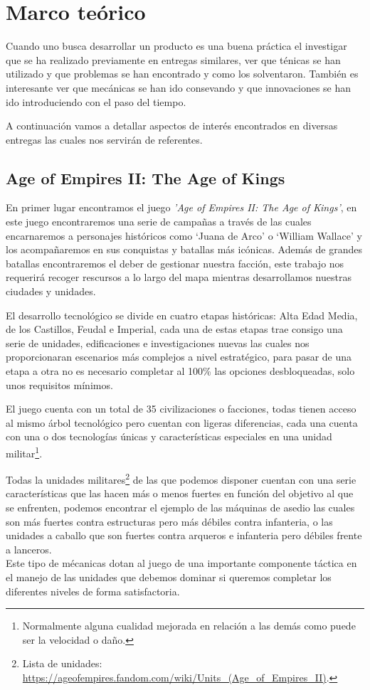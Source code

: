 \chapter{Marco teórico}
\label{Marco_teorico}

Cuando uno busca desarrollar un producto es una buena práctica el investigar que se ha realizado
previamente en entregas similares, ver que ténicas se han utilizado y que problemas se han
encontrado y como los solventaron. También es interesante ver que mecánicas se han ido consevando
y que innovaciones se han ido introduciendo con el paso del tiempo.

A continuación vamos a detallar aspectos de interés encontrados en diversas entregas
las cuales nos servirán de referentes.

\section{Age of Empires II: The Age of Kings}
En primer lugar encontramos el juego \textit{'Age of Empires II: The Age of Kings'}, en
este juego encontraremos una serie de campañas a través de las cuales encarnaremos a personajes
históricos como `Juana de Arco' o `William Wallace' y los acompañaremos en sus conquistas y
batallas más icónicas. Además de grandes batallas encontraremos el deber de gestionar nuestra
facción, este trabajo nos requerirá recoger rescursos a lo largo del mapa mientras desarrollamos 
nuestras ciudades y unidades.

El desarrollo tecnológico se divide en cuatro etapas históricas: Alta Edad Media,
de los Castillos, Feudal e Imperial, cada una de estas etapas trae consigo una serie de
unidades, edificaciones e investigaciones nuevas las cuales nos proporcionaran escenarios
más complejos a nivel estratégico, para pasar de una etapa a otra no es necesario completar
al 100\% las opciones desbloqueadas, solo unos requisitos mínimos.

El juego cuenta con un total de 35 civilizaciones o facciones, todas tienen acceso al mismo árbol
tecnológico pero cuentan con ligeras diferencias, cada una cuenta con una o dos tecnologías únicas
y características especiales en una unidad militar\footnote{Normalmente alguna cualidad mejorada en relación a las
demás como puede ser la velocidad o daño.}.

Todas la unidades militares\footnote{Lista de unidades: \url{https://ageofempires.fandom.com/wiki/Units_(Age_of_Empires_II)}.}
de las que podemos disponer cuentan con una serie características que
las hacen más o menos fuertes en función del objetivo al que se enfrenten, podemos encontrar
el ejemplo de las máquinas de asedio las cuales son más fuertes contra estructuras pero
más débiles contra infanteria, o las unidades a caballo que son fuertes contra arqueros
e infanteria pero débiles frente a lanceros. \\
Este tipo de mécanicas dotan al juego de una importante componente táctica en el manejo
de las unidades que debemos dominar si queremos completar los diferentes niveles de
forma satisfactoria.

